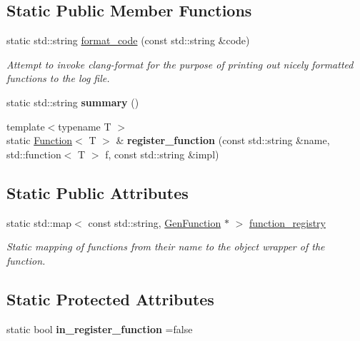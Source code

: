 \subsection*{Static Public Member Functions}
\begin{DoxyCompactItemize}
\item 
static std\+::string \hyperlink{classfv_1_1GenFunction_aecc1187b5bb9c551c104eb8478bdb567}{format\+\_\+code} (const std\+::string \&code)
\begin{DoxyCompactList}\small\item\em Attempt to invoke clang-\/format for the purpose of printing out nicely formatted functions to the log file. \end{DoxyCompactList}\item 
\hypertarget{classfv_1_1GenFunction_a1882aa29a5de803a366ed1e87770a4e2}{}\label{classfv_1_1GenFunction_a1882aa29a5de803a366ed1e87770a4e2} 
static std\+::string {\bfseries summary} ()
\item 
\hypertarget{classfv_1_1GenFunction_a2635f33d1ef39f00c07bde754c98cc6f}{}\label{classfv_1_1GenFunction_a2635f33d1ef39f00c07bde754c98cc6f} 
{\footnotesize template$<$typename T $>$ }\\static \hyperlink{classfv_1_1Function}{Function}$<$ T $>$ \& {\bfseries register\+\_\+function} (const std\+::string \&name, std\+::function$<$ T $>$ f, const std\+::string \&impl)
\end{DoxyCompactItemize}
\subsection*{Static Public Attributes}
\begin{DoxyCompactItemize}
\item 
\hypertarget{classfv_1_1GenFunction_a62f52779bd4aa60fefbd842f557b1f7d}{}\label{classfv_1_1GenFunction_a62f52779bd4aa60fefbd842f557b1f7d} 
static std\+::map$<$ const std\+::string, \hyperlink{classfv_1_1GenFunction}{Gen\+Function} $\ast$ $>$ \hyperlink{classfv_1_1GenFunction_a62f52779bd4aa60fefbd842f557b1f7d}{function\+\_\+registry}
\begin{DoxyCompactList}\small\item\em Static mapping of functions from their name to the object wrapper of the function. \end{DoxyCompactList}\end{DoxyCompactItemize}
\subsection*{Static Protected Attributes}
\begin{DoxyCompactItemize}
\item 
\hypertarget{classfv_1_1GenFunction_a8d8c682bb591126b6396eaf78dbf3157}{}\label{classfv_1_1GenFunction_a8d8c682bb591126b6396eaf78dbf3157} 
static bool {\bfseries in\+\_\+register\+\_\+function} =false
\end{DoxyCompactItemize}
